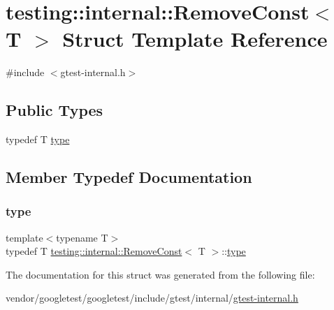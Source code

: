 \hypertarget{structtesting_1_1internal_1_1_remove_const}{}\section{testing\+:\+:internal\+:\+:Remove\+Const$<$ T $>$ Struct Template Reference}
\label{structtesting_1_1internal_1_1_remove_const}


{\ttfamily \#include $<$gtest-\/internal.\+h$>$}

\subsection*{Public Types}
\begin{DoxyCompactItemize}
\item 
typedef T \hyperlink{structtesting_1_1internal_1_1_remove_const_a1be32027ea4edcc0d15abd59aba4a97f}{type}
\end{DoxyCompactItemize}


\subsection{Member Typedef Documentation}
\mbox{\label{structtesting_1_1internal_1_1_remove_const_a1be32027ea4edcc0d15abd59aba4a97f}} 
\subsubsection{\texorpdfstring{type}{type}}
{\footnotesize\ttfamily template$<$typename T$>$ \\
typedef T \hyperlink{structtesting_1_1internal_1_1_remove_const}{testing\+::internal\+::\+Remove\+Const}$<$ T $>$\+::\hyperlink{structtesting_1_1internal_1_1_remove_const_a1be32027ea4edcc0d15abd59aba4a97f}{type}}



The documentation for this struct was generated from the following file\+:\begin{DoxyCompactItemize}
\item 
vendor/googletest/googletest/include/gtest/internal/\hyperlink{gtest-internal_8h}{gtest-\/internal.\+h}\end{DoxyCompactItemize}
